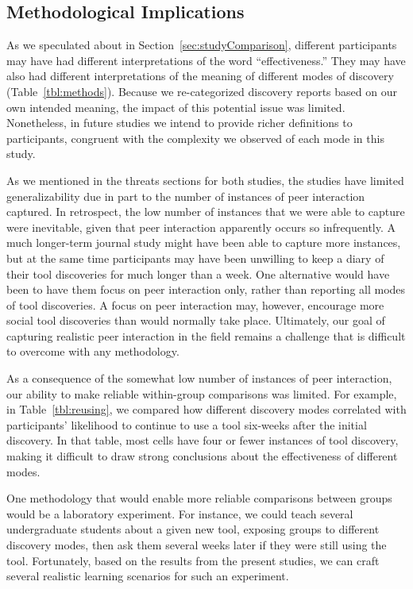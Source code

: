 \documentclass[smallextended]{svjour3}
\newcommand\discovery{peer interaction\xspace}
\newcommand\context{mode\xspace}
\newcommand\contexts{modes\xspace}
\begin{document}
\subsection{Methodological Implications}

As we speculated about in Section~\ref{sec:studyComparison},
different participants may have had different interpretations of the word
``effectiveness.''
They may have also had different interpretations of 
the meaning of different \contexts of discovery (Table~\ref{tbl:methods}).
Because we re-categorized discovery reports based on our own intended meaning, 
the impact of this potential issue was limited.
Nonetheless, in future studies we intend to provide richer
definitions to participants, congruent with the complexity we observed of each
\context in this study.

As we mentioned in the threats sections for both studies,
the studies have limited generalizability due in part to 
the number of instances of \discovery captured.
In retrospect, the low number of instances that we were able to capture were 
inevitable, given that \discovery apparently occurs so infrequently.
A much longer-term journal study might have been able to capture more instances,
but at the same time participants may have been unwilling to keep a diary
of their tool discoveries for much longer than a week.
One alternative would have been to have them focus on \discovery only,
rather than reporting all \contexts of tool discoveries.
A focus on \discovery may, however, encourage more social tool discoveries than
would normally take place.
Ultimately, our goal of capturing realistic \discovery in the field remains a 
challenge that is difficult to overcome with any methodology.

As a consequence of the somewhat low number of instances of \discovery,
our ability to make reliable within-group comparisons was limited.
For example, in Table~\ref{tbl:reusing}, we compared how different 
discovery \contexts correlated with participants' likelihood to continue to use a tool
six-weeks after the initial discovery.
In that table, most cells have four or fewer instances of tool discovery,
making it difficult to draw strong conclusions about the effectiveness of 
different \contexts.

One methodology that would enable more reliable comparisons between
groups would be a laboratory experiment.
For instance, we could teach several undergraduate
students about a given new tool, exposing groups to different 
discovery \contexts, then ask them
several weeks later if they were still using the tool.
Fortunately, based on the results from the present studies, 
we can craft several realistic learning scenarios for such an experiment.
\end{document}
